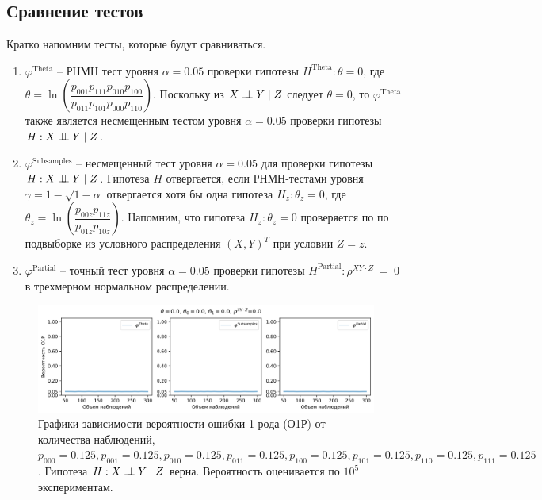 \newpage
\subsection{Сравнение тестов}\label{numerical_exp}

Кратко напомним тесты, которые будут сравниваться.
\begin{enumerate}
    \item $\varphi^{\text{Theta}}$ -- РНМН тест уровня 
    $\alpha=0.05$ проверки гипотезы
    $H^{\text{Theta}}: \theta=0$, где
     $\theta = \ln  \left(\dfrac{p_{001}p_{111}p_{010}p_{100}}{p_{011}p_{101}p_{000}p_{110}}\right)$.
    Поскольку из $X \perp\!\!\!\perp Y \mid Z$ следует $\theta=0$, 
    то $\varphi^{\text{Theta}}$ также является несмещенным тестом уровня $\alpha=0.05$ проверки
    гипотезы $H:X \perp\!\!\!\perp Y \mid Z$.
    \item $\varphi^{\text{Subsamples}}$ -- несмещенный тест уровня $\alpha=0.05$
    для проверки гипотезы $H: X \perp\!\!\!\perp Y \mid Z$.
    Гипотеза $H$ отвергается, если РНМН-тестами уровня 
    $\gamma=1-\sqrt{1-\alpha}$
    отвергается хотя бы 
    одна гипотеза $H_z: \theta_z=0$, где
    $\theta_z = \ln\left(\dfrac{p_{00z}p_{11z}}{p_{01z}p_{10z}}\right)$.
    Напомним, что гипотеза $H_z: \theta_z=0$ проверяется по 
    по подвыборке из условного распределения $(X,Y)^T$ при условии $Z=z$.
    \item $\varphi^{\text{Partial}}$ -- точный тест уровня $\alpha=0.05$
    проверки гипотезы $H^{\text{Partial}}: \rho^{XY\cdot Z}~=~0$ в трехмерном нормальном распределении.
\end{enumerate}

\begin{figure}[H]
    \centering
    \includegraphics[scale=0.5]{images/graph1.png}
    \caption{Графики зависимости вероятности ошибки 1 рода (О1Р) от количества наблюдений,
     $p_{000}=0.125, p_{001}=0.125, p_{010}=0.125, p_{011}=0.125,
    p_{100}=0.125, p_{101}=0.125, p_{110}=0.125, p_{111}=0.125$. 
    Гипотеза $H: X \perp\!\!\!\perp Y \mid Z$ верна.
    Вероятность оценивается по $10^5$ экспериментам.} \label{fig:1}
\end{figure}
    

